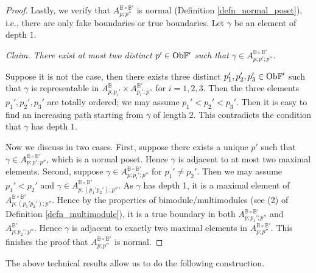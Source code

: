 \documentclass[reqno, 10pt]{amsart}
\numberwithin{equation}{section}
\numberwithin{equation}{section}
\theoremstyle{definition}
\theoremstyle{remark}
\newcommand{\mb}{\mathbb}
\begin{document}
\begin{proof}
Lastly, we verify that $A_{p; p''}^{{\mb B} \circ {\mb B}'}$ is normal (Definition \ref{defn_normal_poset}), i.e., there are only fake boundaries or true boundaries. Let $\gamma$ be an element of depth $1$.

{\it Claim. There exist at most two distinct $p' \in {\rm Ob}{\mb F}'$ such that $\gamma \in A_{p; p'; p''}^{{\mb B} \circ {\mb B}'}$.}

Suppose it is not the case, then there exists three distinct $p_1', p_2', p_3' \in {\rm Ob}{\mb F}'$ such that $\gamma$ is representable in $A_{p; p_i'}^{{\mb B}} \times A_{p_i'; p''}^{{\mb B}'}$ for $i = 1, 2, 3$. Then the three elements $p_1', p_2', p_3'$ are totally ordered; we may assume $p_1' < p_2' < p_3'$. Then it is easy to find an increasing path starting from $\gamma$ of length $2$. This contradicts the condition that $\gamma$ has depth $1$.

Now we discuss in two cases. First, suppose there exists a unique $p'$ such that $\gamma\in A_{p; p'; p''}^{{\mb B} \circ {\mb B}'}$, which is a normal poset. Hence $\gamma$ is adjacent to at most two maximal elements. Second, suppose $\gamma \in A_{p; p_i'; p''}^{{\mb B} \circ {\mb B}'}$ for $p_1' \neq p_2'$. Then we may assume $p_1' < p_2'$ and $\gamma \in A_{p; (p_1'p_2'); p''}^{{\mb B} \circ {\mb B}'}$. As $\gamma$ has depth 1, it is a maximal element of $A_{p; (p_1'p_2'); p''}^{{\mb B} \circ {\mb B}'}$. Hence by the properties of bimodule/multimodules (see (2) of Definition \ref{defn_multimodule}), it is a true boundary in both $A_{p; p_1'; p''}^{{\mb B} \circ {\mb B}'}$ and $A_{p; p_2'; p''}^{{\mb B}'}$. Hence $\gamma$ is adjacent to exactly two maximal elements in $A_{p; p''}^{{\mb B} \circ {\mb B}'}$. This finishes the proof that $A_{p; p''}^{{\mb B} \circ {\mb B}'}$ is normal.
\end{proof}

The above technical results allow us to do the following construction.
\end{document}
